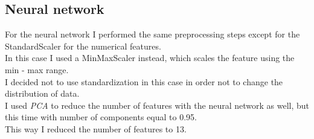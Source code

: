 \documentclass[a4paper,10pt]{report}
\begin{document}
\subsection{Neural network}
For the neural network I performed the same preprocessing steps except for the {\selectfont StandardScaler} for the numerical features.\\
In this case I used a {\selectfont MinMaxScaler} instead, which scales the feature using the min - max range.\\
I decided not to use standardization in this case in order not to change the distribution of data.\\
I used \emph{PCA} to reduce the number of features with the neural network as well, but this time with number of components equal to 0.95.\\
This way I reduced the number of features to 13.
\end{document}
